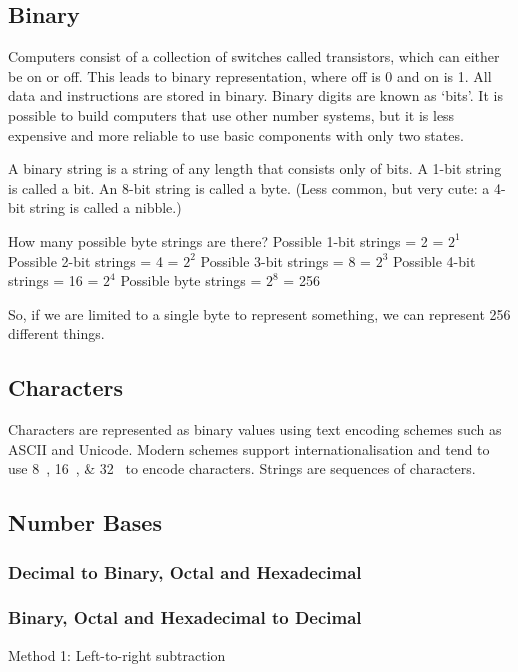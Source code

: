 \subsection{Binary}

Computers consist of a collection of switches called transistors, which can either be on or off.
This leads to binary representation, where off is \num{0} and on is \num{1}.
All data and instructions are stored in binary.
Binary digits are known as `bits'.
It is possible to build computers that use other number systems, but it is less expensive and more reliable to use basic components with only two states.

A binary string is a string of any length that consists only of bits.
A 1-bit string is called a bit.
An 8-bit string is called a byte.
(Less common, but very cute: a 4-bit string is called a nibble.)

How many possible byte strings are
there?
Possible 1-bit strings = 2 = \(2 ^ 1\)
Possible 2-bit strings = 4 = \(2 ^ 2\)
Possible 3-bit strings = 8 = \(2 ^ 3\)
Possible 4-bit strings = 16 = \(2 ^ 4\)
Possible byte strings = \(2 ^ 8\) = 256

So, if we are limited to a single byte
to represent something, we can
represent 256 different things.

\subsection{Characters}

Characters are represented as binary values using text encoding schemes such as ASCII and Unicode.
Modern schemes support internationalisation and tend to use \SIlist[list-final-separator={ or }]{8;16;32}{\bit} to encode characters.
Strings are sequences of characters.

\subsection{Number Bases}

\subsubsection{Decimal to Binary, Octal and Hexadecimal}

\begin{center}
   \quad {} \quad {}
\end{center}

\subsubsection{Binary, Octal and Hexadecimal to Decimal}
Method 1: Left-to-right subtraction

